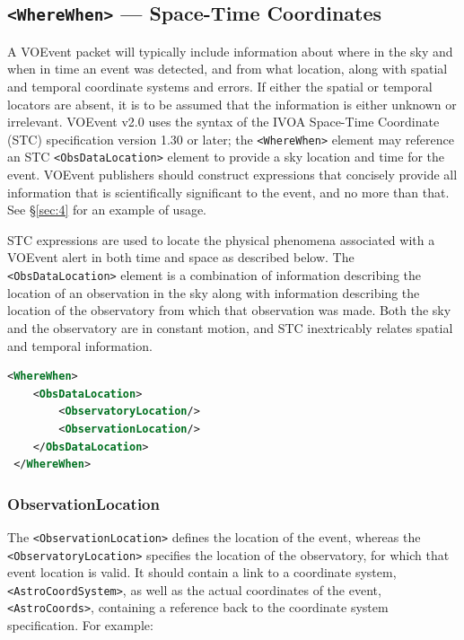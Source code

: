 \documentclass[11pt,a4paper]{ivoa}
\begin{document}
\subsection{{\tt <WhereWhen>} --- Space-Time Coordinates}
\label{sec:3.4}

A VOEvent packet will typically include information about where in the sky and 
when in time an event was detected, and from what location, along with spatial 
and temporal coordinate systems and errors. If either the spatial or temporal 
locators are absent, it is to be assumed that the information is either unknown 
or irrelevant. VOEvent v2.0 uses the syntax of the IVOA Space-Time Coordinate 
(STC) specification version 1.30 or later; the {\tt <WhereWhen>} element may 
reference an STC \citep{2007ivoa.spec.1030R} {\tt <ObsDataLocation>} element to 
provide a sky location and time for the event. VOEvent publishers should 
construct expressions that concisely provide all information that is 
scientifically significant to the event, and no more than that. See 
\S\ref{sec:4} for an example of usage. 

STC expressions are used to locate the physical phenomena associated with a 
VOEvent alert in both time and space as described below. The {\tt 
<ObsDataLocation>} element is a combination of information describing the 
location of an observation in the sky along with information describing the 
location of the observatory from which that observation was made. Both the sky 
and the observatory are in constant motion, and STC inextricably relates spatial 
and temporal information. 

\begin{lstlisting}[language=XML]
<WhereWhen>
    <ObsDataLocation>
        <ObservatoryLocation/>
        <ObservationLocation/>
    </ObsDataLocation>
 </WhereWhen>
\end{lstlisting}

\subsubsection{ObservationLocation}
\label{sec:3.4.1}

The {\tt <ObservationLocation>} defines the location of the event, whereas
the {\tt <ObservatoryLocation>} specifies the location of the observatory, 
for which that event location is valid. It should contain a link to a 
coordinate system, {\tt <AstroCoordSystem>}, as well as the actual coordinates 
of the event, {\tt <AstroCoords>}, containing a reference back to the 
coordinate system specification. For example: 
\end{document}
